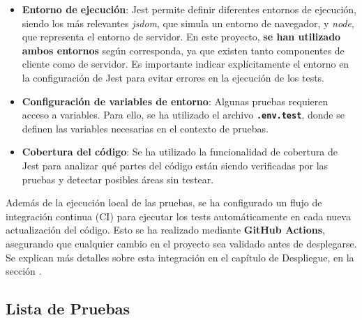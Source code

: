 \begin{itemize}
    \item \textbf{Entorno de ejecución}: Jest permite definir diferentes entornos de ejecución, siendo los más relevantes \textit{jsdom}, que simula un entorno de navegador, y \textit{node}, que representa el entorno de servidor. En este proyecto, \textbf{se han utilizado ambos entornos} según corresponda, ya que existen tanto componentes de cliente como de servidor. Es importante indicar explícitamente el entorno en la configuración de Jest para evitar errores en la ejecución de los tests.

    \item \textbf{Configuración de variables de entorno}: Algunas pruebas requieren acceso a variables. Para ello, se ha utilizado el archivo \textbf{\texttt{.env.test}}, donde se definen las variables necesarias en el contexto de pruebas.

    \item \textbf{Cobertura del código}: Se ha utilizado la funcionalidad de cobertura de Jest para analizar qué partes del código están siendo verificadas por las pruebas y detectar posibles áreas sin testear.
\end{itemize}

Además de la ejecución local de las pruebas, se ha configurado un flujo de integración continua (CI) para ejecutar los tests automáticamente en cada nueva actualización del código. Esto se ha realizado mediante \textbf{GitHub Actions}, asegurando que cualquier cambio en el proyecto sea validado antes de desplegarse. Se explican más detalles sobre esta integración en el capítulo de Despliegue, en la sección .

\subsection{Lista de Pruebas}


